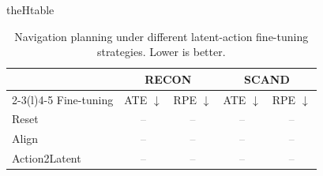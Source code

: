\documentclass{article}
\newcommand{\TBD}{\textcolor{gray}{--}}
\newcommand{\tablepart}[1]{%
  \renewcommand{\thetable}{\arabic{table}#1}%
  \ifcsname theHtable\endcsname
    \renewcommand{\theHtable}{\arabic{table}.#1}%
  \fi
}
\newcommand{\continuedtablepart}[1]{%
  \addtocounter{table}{-1}%
  \tablepart{#1}%
}
\begin{document}
\begin{table}[t]
  \continuedtablepart{b}
  \caption{Navigation planning under different latent-action fine-tuning
  strategies. Lower is better.}
  \label{tab:finetuning_planning}
  \centering
  \small
  \setlength{\tabcolsep}{8pt}
  \renewcommand{\arraystretch}{1.06}
  \begin{tabular}{l cc cc}
    \toprule
    & \multicolumn{2}{c}{RECON} & \multicolumn{2}{c}{SCAND} \\
    \cmidrule(lr){2-3}\cmidrule(l){4-5}
    Fine-tuning & ATE $\downarrow$ & RPE $\downarrow$
    & ATE $\downarrow$ & RPE $\downarrow$ \\
    \midrule
    Reset & \TBD & \TBD & \TBD & \TBD \\
    Align & \TBD & \TBD & \TBD & \TBD \\
    Action2Latent & \TBD & \TBD & \TBD & \TBD \\
    \bottomrule
  \end{tabular}
\end{table}
\end{document}
